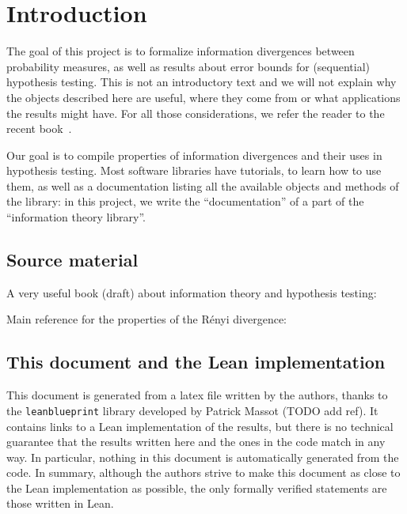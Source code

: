 \chapter*{Introduction}

The goal of this project is to formalize information divergences between probability measures, as well as results about error bounds for (sequential) hypothesis testing.
This is not an introductory text and we will not explain why the objects described here are useful, where they come from or what applications the results might have. For all those considerations, we refer the reader to the recent book~\cite{polyanskiy2024information}.

Our goal is to compile properties of information divergences and their uses in hypothesis testing. Most software libraries have tutorials, to learn how to use them, as well as a documentation listing all the available objects and methods of the library: in this project, we write the ``documentation'' of a part of the ``information theory library''.


\section*{Source material}

A very useful book (draft) about information theory and hypothesis testing: \cite{polyanskiy2024information} 

Main reference for the properties of the Rényi divergence: \cite{van2014renyi}


\section*{This document and the Lean implementation}

This document is generated from a latex file written by the authors, thanks to the \texttt{leanblueprint} library developed by Patrick Massot (TODO add ref). It contains links to a Lean implementation of the results, but there is no technical guarantee that the results written here and the ones in the code match in any way.
In particular, nothing in this document is automatically generated from the code.
In summary, although the authors strive to make this document as close to the Lean implementation as possible, the only formally verified statements are those written in Lean.

